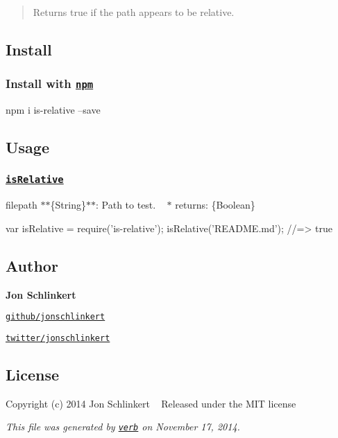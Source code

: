 \begin{quote}
Returns {\ttfamily true} if the path appears to be relative. \end{quote}


\subsection*{Install}

\subsubsection*{Install with \href{npmjs.org}{\tt npm}}


\begin{DoxyCode}
npm i is-relative --save
\end{DoxyCode}


\subsection*{Usage}

\subsubsection*{\href{index.js#L16}{\tt is\+Relative}}


\begin{DoxyItemize}
\item {\ttfamily filepath} $\ast$$\ast$\{String\}$\ast$$\ast$\+: Path to test. ~\newline
$\ast$ {\ttfamily returns}\+: \{Boolean\} ~\newline
 
\begin{DoxyCode}
var isRelative = require('is-relative');
isRelative('README.md');
//=> true
\end{DoxyCode}

\end{DoxyItemize}

\subsection*{Author}

{\bfseries Jon Schlinkert}


\begin{DoxyItemize}
\item \href{https://github.com/jonschlinkert}{\tt github/jonschlinkert}
\item \href{http://twitter.com/jonschlinkert}{\tt twitter/jonschlinkert}
\end{DoxyItemize}

\subsection*{License}

Copyright (c) 2014 Jon Schlinkert ~\newline
Released under the M\+IT license





{\itshape This file was generated by \href{https://github.com/assemble/verb}{\tt verb} on November 17, 2014.} 